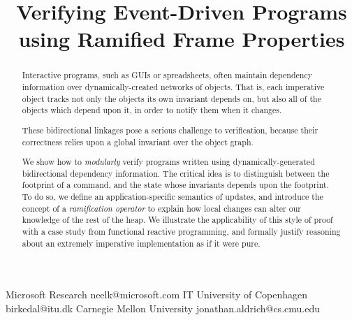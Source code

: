 \documentclass[natbib]{sigplanconf}
\begin{document}


\title{Verifying Event-Driven Programs using Ramified Frame Properties}

           {Microsoft Research}
           {neelk@microsoft.com}
           {IT University of Copenhagen}
           {birkedal@itu.dk}
           {Carnegie Mellon University}
           {jonathan.aldrich@cs.cmu.edu}
\maketitle

\begin{abstract}
Interactive programs, such as GUIs or spreadsheets, often maintain
dependency information over dynamically-created networks of objects.
That is, each imperative object tracks not only the objects its own
invariant depends on, but also all of the objects which depend upon
it, in order to notify them when it changes.

These bidirectional linkages pose a serious challenge to verification,
because their correctness relies upon a global invariant over the
object graph. %

We show how to \emph{modularly} verify programs written
using dynamically-generated bidirectional dependency information. The
critical idea is to distinguish between the footprint of a command,
and the state whose invariants depends upon the footprint. To do so,
we define an application-specific semantics of updates, and introduce
the concept of a \emph{ramification operator} to explain how local
changes can alter our knowledge of the rest of the heap.
We illustrate the applicability of this style of proof with a case
study from functional reactive programming, and formally justify
reasoning about an extremely imperative implementation as if it were
pure.
\end{abstract}
\end{document}
